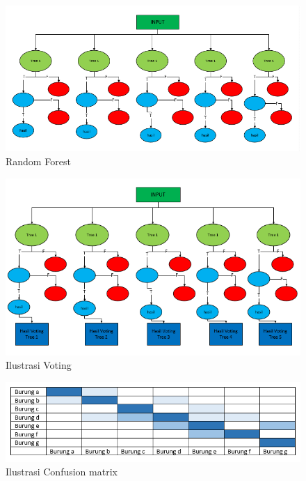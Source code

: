 \begin{figure}[ht]
      \centerline{\includegraphics[width=1\textwidth]
      {figures/cokro/c36}}
      \caption{Random Forest}
      \label{c36}
      \end{figure}

\begin{figure}[ht]
      \centerline{\includegraphics[width=1\textwidth]
      {figures/cokro/c37}}
      \caption{Ilustrasi Voting}
      \label{c37}
      \end{figure}

\begin{figure}[ht]
      \centerline{\includegraphics[width=1\textwidth]
      {figures/cokro/c38}}
      \caption{Ilustrasi Confusion matrix}
      \label{c38}
      \end{figure}

